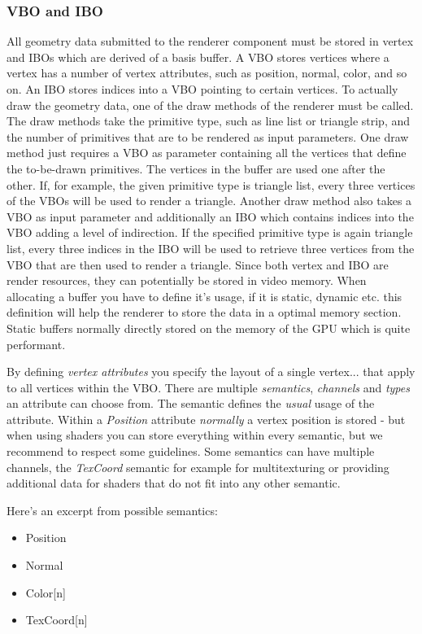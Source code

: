 \subsubsection{\ac{VBO} and \ac{IBO}}
All geometry data submitted to the renderer component must be stored in vertex and \ac{IBO}s which are derived of a basis buffer. A \ac{VBO} stores vertices where a vertex has a number of vertex attributes, such as position, normal, color, and so on. An \ac{IBO} stores indices into a \ac{VBO} pointing to certain vertices. To actually draw the geometry data, one of the draw methods of the renderer must be called. The draw methods take the primitive type, such as line list or triangle strip, and the number of primitives that are to be rendered as input parameters. One draw method just requires a \ac{VBO} as parameter containing all the vertices that define the to-be-drawn primitives. The vertices in the buffer are used one after the other. If, for example, the given primitive type is triangle list, every three vertices of the \ac{VBO}s will be used to render a triangle. Another draw method also takes a \ac{VBO} as input parameter and additionally an \ac{IBO} which contains indices into the \ac{VBO} adding a level of indirection. If the specified primitive type is again triangle list, every three indices in the \ac{IBO} will be used to retrieve three vertices from the \ac{VBO} that are then used to render a triangle. Since both vertex and \ac{IBO} are render resources, they can potentially be stored in video memory. When allocating a buffer you have to define it's usage, if it is static, dynamic etc. this definition will help the renderer to store the data in a optimal memory section. Static buffers normally directly stored on the 
memory of the \ac{GPU} which is quite performant.

By defining \emph{vertex attributes} you specify the layout of a single vertex... that apply to all vertices within the \ac{VBO}. There are multiple \emph{semantics}, \emph{channels} and \emph{types} an attribute can choose from. The semantic defines the \emph{usual} usage of the attribute. Within a \emph{Position} attribute \emph{normally} a vertex position is stored - but when using shaders you can store everything within every semantic, but we recommend to respect some guidelines. Some semantics can have multiple channels, the \emph{TexCoord} semantic for example for multitexturing or providing additional data for shaders that do not fit into any other semantic.

Here's an excerpt from possible semantics:
\begin{itemize}
\item{Position}
\item{Normal}
\item{Color[n]}
\item{TexCoord[n]}
\end{itemize}

